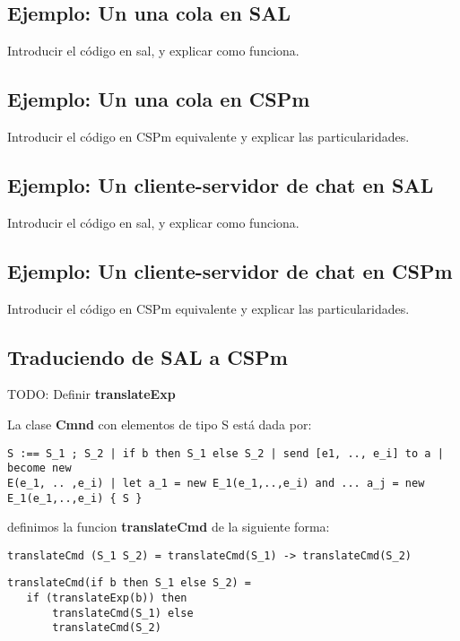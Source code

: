 \documentclass[fleqn]{article}
\begin{document}
\subsection{Ejemplo: Un una cola en SAL}

Introducir el código en sal, y explicar como funciona.
\subsection{Ejemplo: Un una cola en CSPm}

Introducir el código en CSPm equivalente y explicar las particularidades.

\subsection{Ejemplo: Un cliente-servidor de chat en SAL}

Introducir el código en sal, y explicar como funciona.

\subsection{Ejemplo: Un cliente-servidor de chat en CSPm}

Introducir el código en CSPm equivalente y explicar las particularidades.

\subsection{Traduciendo de SAL a CSPm}


TODO: Definir \textbf{translateExp}

La clase \textbf{Cmnd} con elementos de tipo S está dada por:

\begin{verbatim}
S :== S_1 ; S_2 | if b then S_1 else S_2 | send [e1, .., e_i] to a | become new
E(e_1, .. ,e_i) | let a_1 = new E_1(e_1,..,e_i) and ... a_j = new
E_1(e_1,..,e_i) { S } 
\end{verbatim}

definimos la funcion \textbf{translateCmd} de la siguiente forma:

\begin{verbatim}
translateCmd (S_1 S_2) = translateCmd(S_1) -> translateCmd(S_2)
\end{verbatim}


\begin{verbatim}
translateCmd(if b then S_1 else S_2) = 
   if (translateExp(b)) then
       translateCmd(S_1) else 
       translateCmd(S_2)
\end{verbatim}
\end{document}
